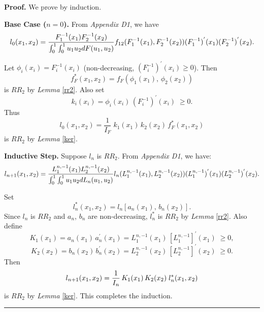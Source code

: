 \documentclass[onecolumn]{article}
\newenvironment{proof}[1][Proof]{\noindent\textbf{#1.} }{\ \rule{0.5em}{0.5em}}
\begin{document}
\begin{proof}
\noindent We prove by induction.

\medskip \noindent \textbf{Base Case ($n=0$).} From \textit{Appendix D1}, we
have 
\begin{equation}
l_{0}(x_{1},x_{2})=\frac{F_{1}^{-1}(x_{1})F_{2}^{-1}(x_{2})}{%
\int_{0}^{1}\int_{0}^{1}u_{1}u_{2}dF(u_{1},u_{2})}%
f_{12}(F_{1}^{-1}(x_{1}),F_{2}^{-1}(x_{2}))(F_{1}^{-1})^{^{\prime
}}(x_{1})(F_{2}^{-1})^{^{\prime }}(x_{2}).  \label{329}
\end{equation}

Let $\phi _{i}(x_{i})=F_{i}^{-1}(x_{i})$ (non-decreasing, $%
(F_{i}^{-1})^{\prime }(x_{i})\geq 0$). Then 
\begin{equation}
f_{F}^{\ast }(x_{1},x_{2})=f_{F}(\phi _{1}(x_{1}),\,\phi _{2}(x_{2}))
\label{330}
\end{equation}%
is $RR_{2}$ by \textit{Lemma} {\footnotesize \ref{rr2}}. Also set 
\begin{equation}
k_{i}(x_{i})=\phi _{i}(x_{i})\,(F_{i}^{-1})^{\prime }(x_{i})\;\geq 0.
\label{331}
\end{equation}%
Thus 
\begin{equation}
l_{0}(x_{1},x_{2})=\frac{1}{I_{F}}\;k_{1}(x_{1})\,k_{2}(x_{2})\,f_{F}^{\ast
}(x_{1},x_{2})  \label{332}
\end{equation}%
is $RR_{2}$ by \textit{Lemma} {\footnotesize \ref{ker}}.

\medskip \noindent \textbf{Inductive Step.} Suppose $l_{n}$ is $RR_{2}$.
From \textit{Appendix D1}, we have:%
\begin{equation}
l_{n+1}(x_{1},x_{2})=\frac{L_{1}^{n,-1}(x_{1})L_{2}^{n,-1}(x_{2})}{%
\int_{0}^{1}\int_{0}^{1}u_{1}u_{2}dL_{n}(u_{1},u_{2})}%
l_{n}(L_{1}^{n,-1}(x_{1}),L_{2}^{n,-1}(x_{2}))(L_{1}^{n,-1})^{^{\prime
}}(x_{1})(L_{2}^{n,-1})^{^{\prime }}(x_{2}).  \label{333}
\end{equation}

Set 
\begin{equation}
l_{n}^{\ast }(x_{1},x_{2})=l_{n}[a_{n}(x_{1}),\,b_{n}(x_{2})].  \label{334}
\end{equation}%
Since $l_{n}$ is $RR_{2}$ and $a_{n}$, $b_{n}$ are non-decreasing, $%
l_{n}^{\ast }$ is $RR_{2}$ by \textit{Lemma} {\footnotesize \ref{rr2}}. Also
define 
\begin{equation}
K_{1}(x_{1})=a_{n}(x_{1})\,a_{n}^{\prime
}(x_{1})=L_{1}^{n,-1}(x_{1})\,[L_{1}^{n,-1}]^{\prime }(x_{1})\;\geq 0,
\label{335}
\end{equation}%
\begin{equation}
K_{2}(x_{2})=b_{n}(x_{2})\,b_{n}^{\prime
}(x_{2})=L_{2}^{n,-1}(x_{2})\,[L_{2}^{n,-1}]^{\prime }(x_{2})\;\geq 0.
\label{336}
\end{equation}%
Then 
\begin{equation}
l_{n+1}(x_{1},x_{2})=\frac{1}{I_{n}}\,K_{1}(x_{1})\,K_{2}(x_{2})\;l_{n}^{%
\ast }(x_{1},x_{2})  \label{337}
\end{equation}%
is $RR_{2}$ by \textit{Lemma} {\footnotesize \ref{ker}}. This completes the
induction.
\end{proof}
\end{document}
